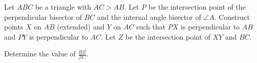 Let $ABC$ be a triangle with $AC > AB$.  Let $P$ be the intersection point of the perpendicular bisector of $BC$ and the internal angle bisector of $\angle{A}$.  Construct points $X$ on $AB$ (extended) and $Y$ on $AC$ such that $PX$ is perpendicular to $AB$ and $PY$ is perpendicular to $AC$.  Let $Z$ be the intersection point of $XY$ and $BC$.

Determine the value of $\frac{BZ}{ZC}$.